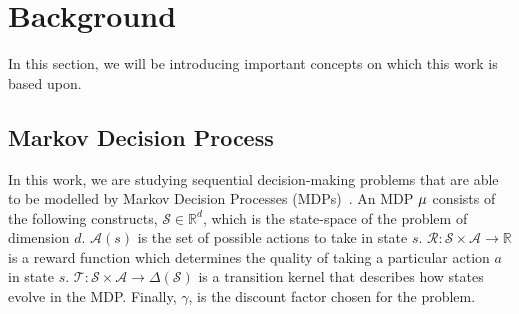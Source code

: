 \section{Background}\label{sec:background}

In this section, we will be introducing important concepts on which this work is based upon.

\subsection{Markov Decision Process}

In this work, we are studying sequential decision-making problems that are able to be modelled by Markov Decision Processes (MDPs)~\cite{sutton2018reinforcement}. An MDP $\mu$ consists of the following constructs, $\mathcal{S} \in \mathbb{R}^d$, which is the state-space of the problem of dimension $d$. $\mathcal{A}(s)$ is the set of possible actions to take in state $s$. $\mathcal{R} : \mathcal{S}\times\mathcal{A}\rightarrow \mathbb{R}$ is a reward function which determines the quality of taking a particular action $a$ in state $s$. $\mathcal{T} : \mathcal{S}\times \mathcal{A} \rightarrow \Delta(\mathcal{S})$ is a transition kernel that describes how states evolve in the MDP. Finally, $\gamma$, is the discount factor chosen for the problem.

